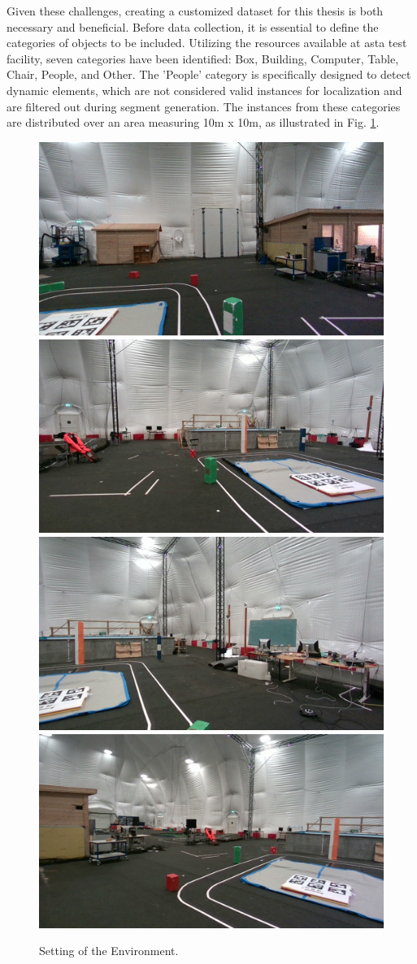 Given these challenges, creating a customized dataset for this thesis is both necessary and beneficial. Before data collection, it is essential to define the categories of objects to be included. Utilizing the resources available at \acrshort{asta} test facility, seven categories have been identified: Box, Building, Computer, Table, Chair, People, and Other. The 'People' category is specifically designed to detect dynamic elements, which are not considered valid instances for localization and are filtered out during segment generation. The instances from these categories are distributed over an area measuring 10m x 10m, as illustrated in Fig. \ref{fig:setting of enviroment}.
\begin{figure}[H]
    \centering
    \includegraphics[width=.5\textwidth]{Pictures/rgb_1701886036.74969.png}\hfill
    \includegraphics[width=.5\textwidth]{Pictures/rgb_1701886141.9452503.png}\hfill
    \includegraphics[width=.5\textwidth]{Pictures/rgb_1701886166.3457768.png}\hfill
    \includegraphics[width=.5\textwidth]{Pictures/rgb_1701886179.3437464.png}
    \caption{Setting of the Environment.}
    \label{fig:setting of enviroment}
\end{figure}

